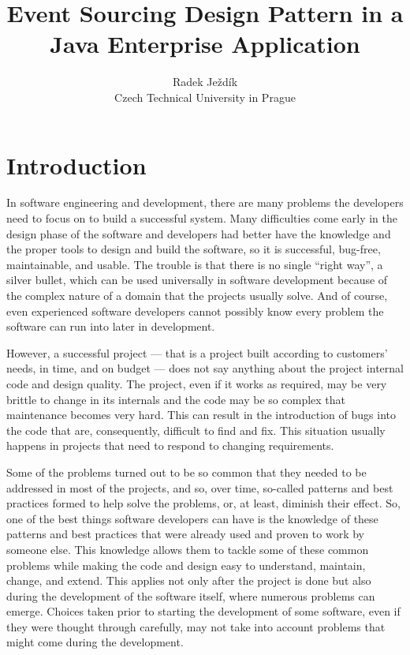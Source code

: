 \documentclass{book}
\begin{document}
\author{Radek Ježdík\\ Czech Technical University in Prague }


\title{Event Sourcing Design Pattern in a Java Enterprise Application}

 

\maketitle
 
\frontmatter 
\tableofcontents 
\newpage




\section{Introduction}\label{introduction}

In software engineering and development, there are many problems the
developers need to focus on to build a successful system. Many
difficulties come early in the design phase of the software and
developers had better have the knowledge and the proper tools to design
and build the software, so it is successful, bug-free, maintainable, and
usable. The trouble is that there is no single ``right way'', a silver
bullet, which can be used universally in software development because of
the complex nature of a domain that the projects usually solve. And of
course, even experienced software developers cannot possibly know every
problem the software can run into later in development.

However, a successful project --- that is a project built according to
customers' needs, in time, and on budget --- does not say anything about
the project internal code and design quality. The project, even if it
works as required, may be very brittle to change in its internals and
the code may be so complex that maintenance becomes very hard. This can
result in the introduction of bugs into the code that are, consequently,
difficult to find and fix. This situation usually happens in projects
that need to respond to changing requirements.

Some of the problems turned out to be so common that they needed to be
addressed in most of the projects, and so, over time, so-called patterns
and best practices formed to help solve the problems, or, at least,
diminish their effect. So, one of the best things software developers
can have is the knowledge of these patterns and best practices that were
already used and proven to work by someone else. This knowledge allows
them to tackle some of these common problems while making the code and
design easy to understand, maintain, change, and extend. This applies
not only after the project is done but also during the development of
the software itself, where numerous problems can emerge. Choices taken
prior to starting the development of some software, even if they were
thought through carefully, may not take into account problems that might
come during the development.
\end{document}
